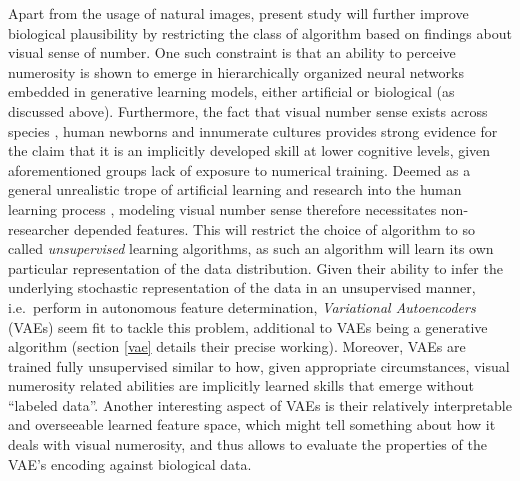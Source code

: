 \documentclass[twocolumn]{article}
\begin{document}
\indent Apart from the usage of natural images, present study will further improve biological plausibility by restricting the class of algorithm based on findings about visual sense of number. One such constraint is that an ability to perceive numerosity is shown to emerge in hierarchically organized neural networks embedded in generative learning models, either artificial or biological (as discussed above). Furthermore, the fact that visual number sense exists across species \citep{animalsnumericalcognition}, human newborns \citep[chap. 1]{lakoff} and innumerate cultures \citetext{\citealp[p.~261]{dehaene2011number}; \citealp{franka2008number}} provides strong evidence for the claim that it is an implicitly developed skill at lower cognitive levels, given aforementioned groups lack of exposure to numerical training. Deemed as a general unrealistic trope of artificial learning \citep{dreyfus2007heideggerian} and research into the human learning process \citep{Zorzi2013}, modeling visual number sense therefore necessitates non-researcher depended features. This will restrict the choice of algorithm to so called \emph{unsupervised} learning algorithms, as such an algorithm will learn its own particular representation of the data distribution. Given their ability to infer the underlying stochastic representation of the data in an unsupervised manner, i.e.~perform in autonomous feature determination, \emph{Variational Autoencoders} (VAEs) seem fit to tackle this problem, additional to VAEs being a generative algorithm (section \ref{vae} details their precise working). Moreover, VAEs are trained fully unsupervised similar to how, given appropriate circumstances, visual numerosity related abilities are implicitly learned skills that emerge without ``labeled data''. Another interesting aspect of VAEs is their relatively interpretable and overseeable learned feature space, which might tell something about how it deals with visual numerosity, and thus allows to evaluate the properties of the VAE's encoding against biological data.
\end{document}
